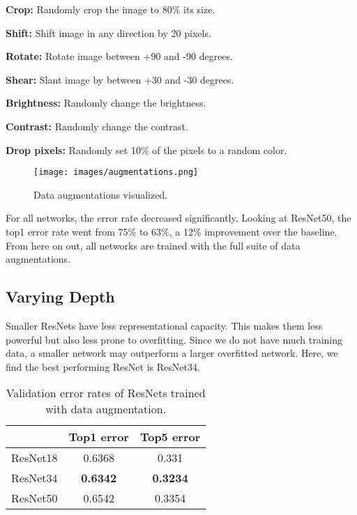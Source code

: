 \documentclass[10pt,twocolumn,letterpaper]{article}
\begin{document}
\textbf{Crop:} Randomly crop the image to 80\% its size.

\textbf{Shift:} Shift image in any direction by 20 pixels.

\textbf{Rotate:} Rotate image between +90 and -90 degrees.

\textbf{Shear:} Slant image by between +30 and -30 degrees.

\textbf{Brightness:} Randomly change the brightness.

\textbf{Contrast:} Randomly change the contrast.

\textbf{Drop pixels:} Randomly set 10\% of the pixels to a random color.

\begin{figure}[h]
\begin{center}
\texttt{[image: images/augmentations.png]}
\end{center}
   \caption{Data augmentations visualized.}
\label{fig:long}
\label{fig:onecol}
\end{figure}

For all networks, the error rate decreased significantly. Looking at ResNet50, the top1 error rate went from 75\% to 63\%, a 12\% improvement over the baseline. From here on out, all networks are trained with the full suite of data augmentations.

\subsection{Varying Depth}
Smaller ResNets have less representational capacity. This makes them less powerful but also less prone to overfitting. Since we do not have much training data, a smaller network may outperform a larger overfitted network. Here, we find the best performing ResNet is ResNet34.

\begin{table}[h]
\centering
 \begin{tabular}{||c c c||} 
 \hline
 & Top1 error & Top5 error \\ [0.5ex] 
 \hline\hline
 ResNet18 & 0.6368 & 0.331 \\ [1ex] 
 \hline
 ResNet34 & \bf{0.6342} & \bf{0.3234} \\ [1ex] 
 \hline
 ResNet50 & 0.6542 & 0.3354 \\ [1ex] 
 \hline
\end{tabular}
\smallskip
\caption{Validation error rates of ResNets trained with data augmentation.}
\label{table:1}
\end{table}
\end{document}
